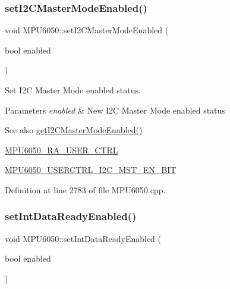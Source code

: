 \subsubsection{\texorpdfstring{setI2CMasterModeEnabled()}{setI2CMasterModeEnabled()}}
{\footnotesize\ttfamily void M\+P\+U6050\+::set\+I2\+C\+Master\+Mode\+Enabled (\begin{DoxyParamCaption}\item[{bool}]{enabled }\end{DoxyParamCaption})}

Set I2C Master Mode enabled status. 
\begin{DoxyParams}{Parameters}
{\em enabled} & New I2C Master Mode enabled status \\
\hline
\end{DoxyParams}
\begin{DoxySeeAlso}{See also}
\mbox{\hyperlink{classMPU6050_a6b45e538f2082eb1b1975ed56e3e21bc}{get\+I2\+C\+Master\+Mode\+Enabled()}} 

\mbox{\hyperlink{MPU6050_8h_acd4c638a6f677a42ecb9a3d7612d087a}{M\+P\+U6050\+\_\+\+R\+A\+\_\+\+U\+S\+E\+R\+\_\+\+C\+T\+RL}} 

\mbox{\hyperlink{MPU6050_8h_a1974fd2b8e743e0c5517ff903da5f99a}{M\+P\+U6050\+\_\+\+U\+S\+E\+R\+C\+T\+R\+L\+\_\+\+I2\+C\+\_\+\+M\+S\+T\+\_\+\+E\+N\+\_\+\+B\+IT}} 
\end{DoxySeeAlso}


Definition at line 2783 of file M\+P\+U6050.\+cpp.


\begin{DoxyCode}{0}

\end{DoxyCode}
\mbox{\label{classMPU6050_a67a11be7fc7ab6b1186469b94ea33dda}} 
\subsubsection{\texorpdfstring{setIntDataReadyEnabled()}{setIntDataReadyEnabled()}}
{\footnotesize\ttfamily void M\+P\+U6050\+::set\+Int\+Data\+Ready\+Enabled (\begin{DoxyParamCaption}\item[{bool}]{enabled }\end{DoxyParamCaption})}

